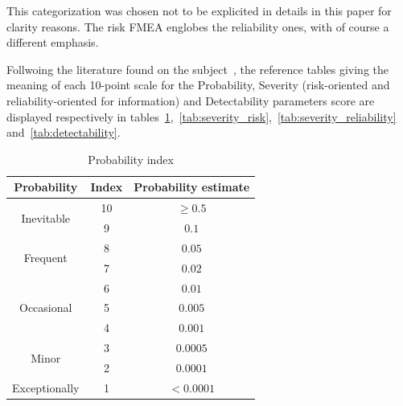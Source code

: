 This categorization was chosen not to be explicited in details in this paper for clarity reasons. The risk FMEA englobes the reliability ones, with of course a different emphasis.

Follwoing the literature found on the subject~\cite{garcia2013}, the reference tables giving the meaning of each 10-point scale for the Probability, Severity (risk-oriented and reliability-oriented for information) and Detectability parameters score are displayed respectively in tables~\ref{tab:probability},~\ref{tab:severity_risk},~\ref{tab:severity_reliability} and~\ref{tab:detectability}.


\begin{table}[!htb]
    \centering
        \begin{tabular}{ ccc }
        \hline
        Probability & Index & Probability estimate \\ \hline\hline
        \multirow{2}{*}{Inevitable} & 10 & $\geq 0.5$\\
                                    & 9  & $0.1$ \\
        \multirow{2}{*}{Frequent}   & 8  & $0.05$\\
                                    & 7  & $0.02$ \\
        \multirow{3}{*}{Occasional}   & 6  & $0.01$\\
                                    & 5  & $0.005$ \\
                                    & 4  & $0.001$ \\
        \multirow{2}{*}{Minor}   & 3  & $0.0005$\\
                                    & 2  & $0.0001$ \\
        Exceptionally & 1  & $< 0.0001$ \\
                                     
        \end{tabular}
        \caption{Probability index}\label{tab:probability}
\end{table}

